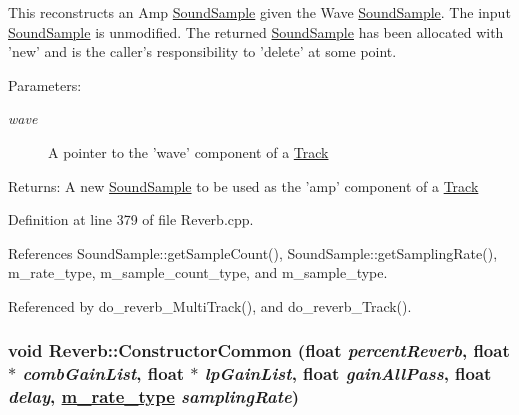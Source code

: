 This reconstructs an Amp \hyperlink{classSoundSample}{Sound\-Sample} given the Wave \hyperlink{classSoundSample}{Sound\-Sample}. The input \hyperlink{classSoundSample}{Sound\-Sample} is unmodified. The returned \hyperlink{classSoundSample}{Sound\-Sample} has been allocated with 'new' and is the caller's responsibility to 'delete' at some point.

\begin{Desc}
\item[Parameters:]
\begin{description}
\item[{\em wave}]A pointer to the 'wave' component of a \hyperlink{classTrack}{Track} \end{description}
\end{Desc}
\begin{Desc}
\item[Returns:]A new \hyperlink{classSoundSample}{Sound\-Sample} to be used as the 'amp' component of a \hyperlink{classTrack}{Track} \end{Desc}


Definition at line 379 of file Reverb.cpp.

References Sound\-Sample::get\-Sample\-Count(), Sound\-Sample::get\-Sampling\-Rate(), m\_\-rate\_\-type, m\_\-sample\_\-count\_\-type, and m\_\-sample\_\-type.

Referenced by do\_\-reverb\_\-Multi\-Track(), and do\_\-reverb\_\-Track().\hypertarget{classReverb_a4}{
\subsubsection[ConstructorCommon]{\setlength{\rightskip}{0pt plus 5cm}void Reverb::Constructor\-Common (float {\em percent\-Reverb}, float $\ast$ {\em comb\-Gain\-List}, float $\ast$ {\em lp\-Gain\-List}, float {\em gain\-All\-Pass}, float {\em delay}, \hyperlink{Types_8h_a4}{m\_\-rate\_\-type} {\em sampling\-Rate})}}
\label{classReverb_a4}


